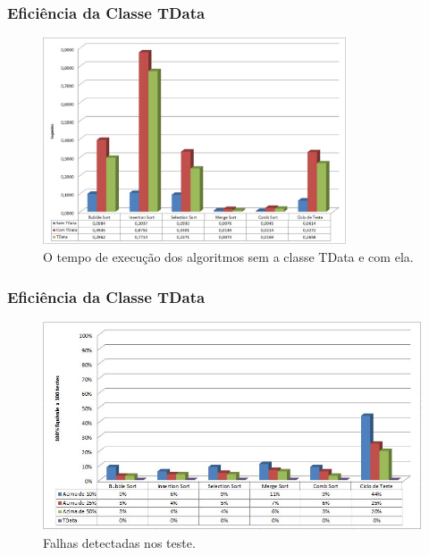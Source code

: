 \begin{frame}
	\frametitle{Eficiência da Classe TData}
	\begin{figure}
		\begin{center}\includegraphics[width=0.8\textwidth]{./figuras/tempoTData.png}\end{center}
		\caption{O tempo de execução dos algoritmos sem a classe TData e com ela.}
	\end{figure}
\end{frame}

\begin{frame}
	\frametitle{Eficiência da Classe TData}
	\begin{figure}
		\begin{center}\includegraphics[width=1.0\textwidth]{./figuras/falhaTData.png}\end{center}
		\caption{Falhas detectadas nos teste.}
	\end{figure}
\end{frame}


